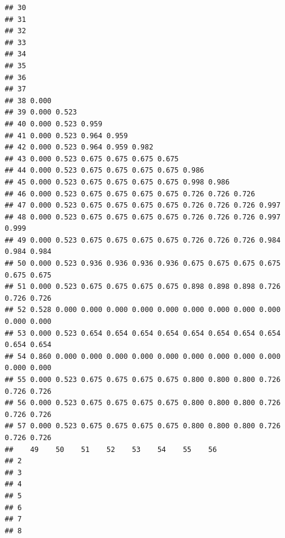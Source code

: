 \documentclass[
]{book}
\begin{document}
\begin{verbatim}
## 30                                                                        
## 31                                                                        
## 32                                                                        
## 33                                                                        
## 34                                                                        
## 35                                                                        
## 36                                                                        
## 37                                                                        
## 38 0.000                                                                  
## 39 0.000 0.523                                                            
## 40 0.000 0.523 0.959                                                      
## 41 0.000 0.523 0.964 0.959                                                
## 42 0.000 0.523 0.964 0.959 0.982                                          
## 43 0.000 0.523 0.675 0.675 0.675 0.675                                    
## 44 0.000 0.523 0.675 0.675 0.675 0.675 0.986                              
## 45 0.000 0.523 0.675 0.675 0.675 0.675 0.998 0.986                        
## 46 0.000 0.523 0.675 0.675 0.675 0.675 0.726 0.726 0.726                  
## 47 0.000 0.523 0.675 0.675 0.675 0.675 0.726 0.726 0.726 0.997            
## 48 0.000 0.523 0.675 0.675 0.675 0.675 0.726 0.726 0.726 0.997 0.999      
## 49 0.000 0.523 0.675 0.675 0.675 0.675 0.726 0.726 0.726 0.984 0.984 0.984
## 50 0.000 0.523 0.936 0.936 0.936 0.936 0.675 0.675 0.675 0.675 0.675 0.675
## 51 0.000 0.523 0.675 0.675 0.675 0.675 0.898 0.898 0.898 0.726 0.726 0.726
## 52 0.528 0.000 0.000 0.000 0.000 0.000 0.000 0.000 0.000 0.000 0.000 0.000
## 53 0.000 0.523 0.654 0.654 0.654 0.654 0.654 0.654 0.654 0.654 0.654 0.654
## 54 0.860 0.000 0.000 0.000 0.000 0.000 0.000 0.000 0.000 0.000 0.000 0.000
## 55 0.000 0.523 0.675 0.675 0.675 0.675 0.800 0.800 0.800 0.726 0.726 0.726
## 56 0.000 0.523 0.675 0.675 0.675 0.675 0.800 0.800 0.800 0.726 0.726 0.726
## 57 0.000 0.523 0.675 0.675 0.675 0.675 0.800 0.800 0.800 0.726 0.726 0.726
##    49    50    51    52    53    54    55    56   
## 2                                                 
## 3                                                 
## 4                                                 
## 5                                                 
## 6                                                 
## 7                                                 
## 8                                                 

\end{verbatim}
\end{document}
